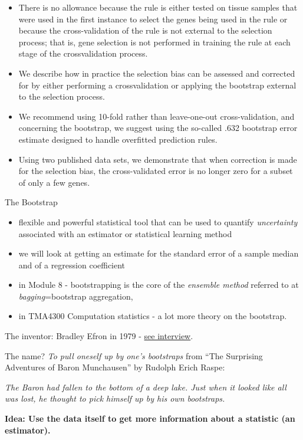 \documentclass[10pt,ignorenonframetext,]{beamer}
\providecommand{\tightlist}{%
  \setlength{\itemsep}{0pt}\setlength{\parskip}{0pt}}
\begin{document}
\begin{frame}

\begin{itemize}
\tightlist
\item
  There is no allowance because the rule is either tested on tissue
  samples that were used in the first instance to select the genes being
  used in the rule or because the cross-validation of the rule is not
  external to the selection process; that is, gene selection is not
  performed in training the rule at each stage of the crossvalidation
  process.
\item
  We describe how in practice the selection bias can be assessed and
  corrected for by either performing a crossvalidation or applying the
  bootstrap external to the selection process.
\item
  We recommend using 10-fold rather than leave-one-out cross-validation,
  and concerning the bootstrap, we suggest using the so-called .632
  bootstrap error estimate designed to handle overfitted prediction
  rules.
\item
  Using two published data sets, we demonstrate that when correction is
  made for the selection bias, the cross-validated error is no longer
  zero for a subset of only a few genes.
\end{itemize}

\end{frame}

\begin{frame}{The Bootstrap}

\begin{itemize}
\tightlist
\item
  flexible and powerful statistical tool that can be used to quantify
  \emph{uncertainty} associated with an estimator or statistical
  learning method
\item
  we will look at getting an estimate for the standard error of a sample
  median and of a regression coefficient
\item
  in Module 8 - bootstrapping is the core of the \emph{ensemble method}
  referred to at \emph{bagging}=bootstrap aggregation,
\item
  in TMA4300 Computation statistics - a lot more theory on the
  bootstrap.
\end{itemize}

\end{frame}

\begin{frame}

The inventor: Bradley Efron in 1979 -
\href{https://www.youtube.com/watch?v=6l9V1sINzhE}{see interview}.

The name? \emph{To pull oneself up by one's bootstraps} from ``The
Surprising Adventures of Baron Munchausen'' by Rudolph Erich Raspe:

\emph{The Baron had fallen to the bottom of a deep lake. Just when it
looked like all was lost, he thought to pick himself up by his own
bootstraps.}

\textbf{Idea: Use the data itself to get more information about a
statistic (an estimator).}

\end{frame}
\end{document}
